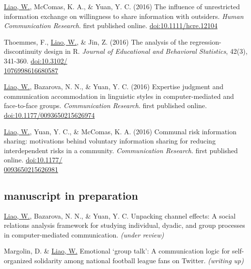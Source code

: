 \documentclass[11pt, letterpaper]{article} %
\newcommand{\years}[1]{\leavevmode\marginnote{\scriptsize #1}} %
\begin{document}
\begin{hangparas}{.25in}{1}
\underline{Liao, W.}, \years{2016}  McComas, K. A., \& Yuan, Y. C. (2016) The influence of unrestricted information exchange on willingness to share information with outsiders. \textsl{Human Communication Research}. first published online. \href{http://doi.org/10.1111/hcre.12104}{doi:10.1111/hcre.12104} 

    Thoemmes, F., \underline{Liao, W.}, \& Jin, Z. (2016) The analysis of the regression-discontinuity design in R. \textsl{Journal of Educational and Behavioral Statistics}, 42(3), 341-360. \href{http://doi.org/10.3102/1076998616680587}{doi:10.3102/\\1076998616680587}

    \underline{Liao, W.}, Bazarova, N. N., \& Yuan, Y. C. (2016) Expertise judgment and communication accommodation in linguistic styles in computer-mediated and face-to-face groups. \textsl{Communication Research}. first published online. \href{http://doi.org/10.1177/0093650215626974}{doi:10.1177/0093650215626974}

    \underline{Liao, W.}, Yuan, Y. C., \& McComas, K. A. (2016) Communal risk information sharing: motivations behind voluntary information sharing for reducing interdependent risks in a community. \textsl{Communication Research}. first published online. \href{http://doi.org/10.1177/0093650215626981}{doi:10.1177/\\0093650215626981}
\end{hangparas}


\subsection*{manuscript in preparation}

\begin{hangparas}{.25in}{1}

\underline{Liao, W.}, Bazarova, N. N., \& Yuan, Y. C. Unpacking channel effects: A social relations analysis framework for studying individual, dyadic, and group processes in computer-mediated communication. \textsl{(under review)}

Margolin, D. \& \underline{Liao, W.} Emotional ‘group talk’: A communication logic for self-organized solidarity among national football league fans on Twitter. \textsl{(writing up)}


\end{hangparas}
\end{document}
